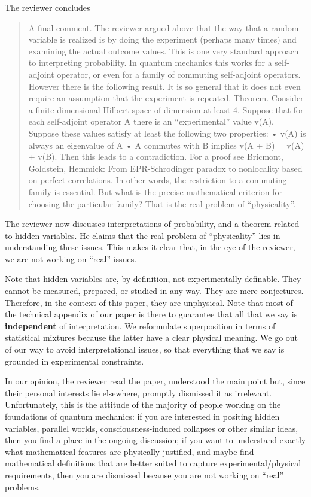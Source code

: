 \documentclass[11pt, executivepaper]{article}
\begin{document}
The reviewer concludes
\begin{quote}
A final comment. The reviewer argued above that the way that a random
variable is realized is by doing the experiment (perhaps many times) and examining
the actual outcome values. This is one very standard approach to
interpreting probability.
In quantum mechanics this works for a self-adjoint operator, or even for
a family of commuting self-adjoint operators. However there is the following
result. It is so general that it does not even require an assumption that the
experiment is repeated.
Theorem. Consider a finite-dimensional Hilbert space of dimension at least
4. Suppose that for each self-adjoint operator A there is an “experimental”
value v(A). Suppose these values satisfy at least the following two properties:
• v(A) is always an eigenvalue of A
• A commutes with B implies v(A + B) = v(A) + v(B).
Then this leads to a contradiction. For a proof see Bricmont, Goldstein,
Hemmick: From EPR-Schrodinger paradox to nonlocality based on perfect correlations.
In other words, the restriction to a commuting family is essential. But what
is the precise mathematical criterion for choosing the particular family? That
is the real problem of “physicality”.
\end{quote}
The reviewer now discusses interpretations of probability, and a theorem related to hidden variables. He claims that the real problem of ``physicality'' lies in understanding these issues. This makes it clear that, in the eye of the reviewer, we are not working on ``real'' issues.

Note that hidden variables are, by definition, not experimentally definable. They cannot be measured, prepared, or studied in any way. They are mere conjectures. Therefore, in the context of this paper, they are unphysical. Note that most of the technical appendix of our paper is there to guarantee that all that we say is \textbf{independent} of interpretation. We reformulate superposition in terms of statistical mixtures because the latter have a clear physical meaning. We go out of our way to avoid interpretational issues, so that everything that we say is grounded in experimental constraints.

In our opinion, the reviewer read the paper, understood the main point but, since their personal interests lie elsewhere, promptly dismissed it as irrelevant. Unfortunately, this is the attitude of the majority of people working on the foundations of quantum mechanics: if you are interested in positing hidden variables, parallel worlds, consciousness-induced collapses or other similar ideas, then you find a place in the ongoing discussion; if you want to understand exactly what mathematical features are physically justified, and maybe find mathematical definitions that are better suited to capture experimental/physical requirements, then you are dismissed because you are not working on ``real'' problems. 
\end{document}
